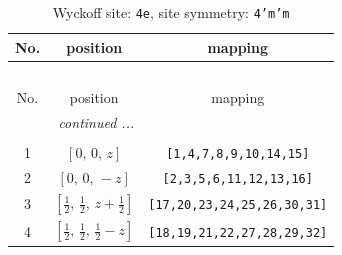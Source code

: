 \documentclass[fleqn,8pt]{jsarticle}
\begin{document}
\renewcommand{\arraystretch}{1.2}
\begin{longtable}{ccc}
\caption{Wyckoff site: {\tt 4e}, site symmetry: {\tt 4'm'm}}
 \\
 \hline \hline
No. & position & mapping \\ \hline \endfirsthead

\multicolumn{2}{l}{\tablename\ \thetable{}} \\
 \hline \hline
No. & position & mapping \\ \hline \endhead

 \hline \hline
\multicolumn{2}{r}{\footnotesize\it continued ...} \\ \endfoot

 \hline \hline
\multicolumn{2}{r}{} \\ \endlastfoot

1 & $\left[ 0,\, 0,\, z \right]$ & {\tt [1,4,7,8,9,10,14,15]} \\ \hline
2 & $\left[ 0,\, 0,\, - z \right]$ & {\tt [2,3,5,6,11,12,13,16]} \\ \hline
3 & $\left[ \frac{1}{2},\, \frac{1}{2},\, z + \frac{1}{2} \right]$ & {\tt [17,20,23,24,25,26,30,31]} \\ \hline
4 & $\left[ \frac{1}{2},\, \frac{1}{2},\, \frac{1}{2} - z \right]$ & {\tt [18,19,21,22,27,28,29,32]} \\
\end{longtable}
\renewcommand{\arraystretch}{1.2}
\end{document}
